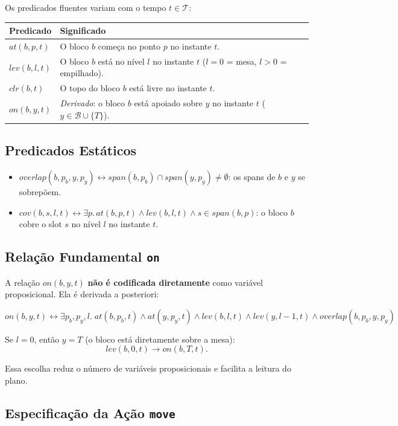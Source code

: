 \documentclass[12pt,a4paper]{article}
\begin{document}
Os predicados fluentes variam com o tempo $t \in \mathcal{T}$:

\begin{longtable}{@{}p{4cm}p{10cm}@{}}
\toprule
\textbf{Predicado} & \textbf{Significado} \\
\midrule
\endhead
$at(b,p,t)$ & O bloco $b$ começa no ponto $p$ no instante $t$. \\
$lev(b,l,t)$ & O bloco $b$ está no nível $l$ no instante $t$ ($l=0$ = mesa, $l>0$ = empilhado). \\
$clr(b,t)$ & O topo do bloco $b$ está livre no instante $t$. \\
$on(b,y,t)$ & \emph{Derivado}: o bloco $b$ está apoiado sobre $y$ no instante $t$ ($y \in \mathcal{B} \cup \{T\}$). \\
\bottomrule
\end{longtable}

\subsection{Predicados Estáticos}

\begin{itemize}[leftmargin=1.2cm]
    \item $overlap(b,p_b,y,p_y) \leftrightarrow span(b,p_b) \cap span(y,p_y) \neq \emptyset$: os spans de $b$ e $y$ se sobrepõem.
    \item $cov(b,s,l,t) \leftrightarrow \exists p.\, at(b,p,t) \wedge lev(b,l,t) \wedge s \in span(b,p)$: o bloco $b$ cobre o slot $s$ no nível $l$ no instante $t$.
\end{itemize}

\subsection{Relação Fundamental \texttt{on}}

A relação $on(b,y,t)$ \textbf{não é codificada diretamente} como variável proposicional. Ela é derivada a posteriori:

\[
on(b,y,t) \leftrightarrow \exists p_b, p_y, l.\;
at(b,p_b,t) \wedge at(y,p_y,t) \wedge lev(b,l,t) \wedge lev(y,l-1,t) \wedge overlap(b,p_b,y,p_y)
\]

Se $l=0$, então $y = T$ (o bloco está diretamente sobre a mesa):
\[
lev(b,0,t) \to on(b,T,t).
\]

Essa escolha reduz o número de variáveis proposicionais e facilita a leitura do plano.

\subsection{Especificação da Ação \texttt{move}}
\label{sec:move}
\end{document}
